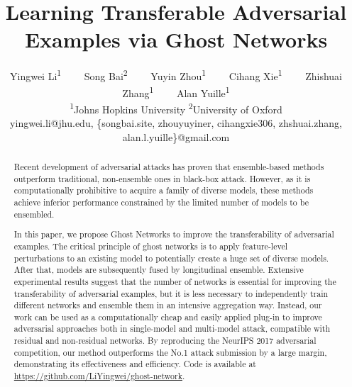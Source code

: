 \documentclass[letterpaper]{article} %
\title{Learning Transferable Adversarial Examples via Ghost Networks}
\author{
Yingwei Li\textsuperscript{\rm 1}~~~~
Song Bai\textsuperscript{\rm 2}~~~~
Yuyin Zhou\textsuperscript{\rm 1}~~~~
Cihang Xie\textsuperscript{\rm 1}~~~~
Zhishuai Zhang\textsuperscript{\rm 1}~~~~ 
Alan Yuille\textsuperscript{\rm 1} \\
\textsuperscript{\rm 1}Johns Hopkins University \qquad\qquad \textsuperscript{\rm 2}University of Oxford \\
{\normalsize yingwei.li@jhu.edu, \{songbai.site, zhouyuyiner, cihangxie306, zhshuai.zhang, alan.l.yuille\}@gmail.com}
}
\begin{document}
\maketitle

\begin{abstract}
Recent development of adversarial attacks has proven that ensemble-based methods outperform traditional, non-ensemble ones in black-box attack. However, as it is computationally prohibitive to acquire a family of diverse models, these methods achieve inferior performance constrained by the limited number of models to be ensembled.

In this paper, we propose Ghost Networks to improve the transferability of adversarial examples. The critical principle of ghost networks is to apply feature-level perturbations to an existing model to potentially create a huge set of diverse models. After that, models are subsequently fused by longitudinal ensemble.
Extensive experimental results suggest that the number of networks is essential for improving the transferability of adversarial examples, but it is less necessary to independently train different networks and ensemble them in an intensive aggregation way. Instead, our work can be used as a computationally cheap and easily applied plug-in to improve adversarial approaches both in single-model and multi-model attack, compatible with residual and non-residual networks. By reproducing the NeurIPS 2017 adversarial competition, our method outperforms the No.1 attack submission by a large margin, demonstrating its effectiveness and efficiency. Code is available at \url{https://github.com/LiYingwei/ghost-network}.



\end{abstract}
\end{document}
